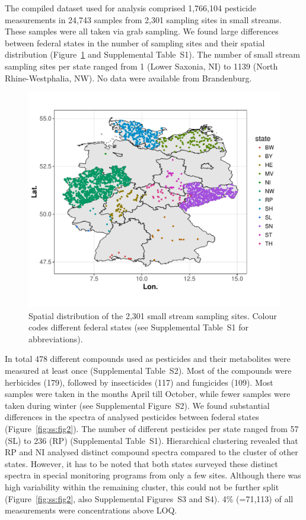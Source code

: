 The compiled dataset used for analysis comprised 1,766,104 pesticide measurements in 24,743 samples from 2,301 sampling sites in small streams.  %
These samples were all taken via grab sampling.  
We found large differences between federal states in the number of sampling sites and their spatial distribution (Figure~\ref{fig:ss:fig1} and Supplemental Table~S1). 
The number of small stream sampling sites per state ranged from 1 (Lower Saxonia, NI) to 1139 (North Rhine-Westphalia, NW).
No data were available from Brandenburg. 

\begin{figure}[ht]
  \includegraphics[width=1\textwidth]{chapters/smallstreams/figure1.pdf}
  \caption[Spatial distribution of the 2,301 small stream sampling sites.]{Spatial distribution of the 2,301 small stream sampling sites. Colour codes different federal states (see Supplemental Table~S1 for abbreviations).}
  \label{fig:ss:fig1}
\end{figure}

In total 478 different compounds used as pesticides and their metabolites were measured at least once (Supplemental Table~S2). 
Most of the compounds were herbicides (179), followed by insecticides (117) and fungicides (109). %
Most samples were taken in the months April till October, while fewer samples were taken during winter (see Supplemental Figure~S2).
We found substantial differences in the spectra of analysed pesticides between federal states (Figure~\ref{fig:ss:fig2}).
The number of different pesticides per state ranged from 57 (SL) to 236 (RP) (Supplemental Table~S1). 
Hierarchical clustering revealed that RP and NI analysed distinct compound spectra compared to the cluster of other states. 
However, it has to be noted that both states surveyed these distinct spectra in special monitoring programs from only a few sites. 
Although there was high variability within the remaining cluster, this could not be further split (Figure~\ref{fig:ss:fig2}, also Supplemental Figures~S3 and S4).
4\% (=71,113) of all measurements were concentrations above LOQ.

